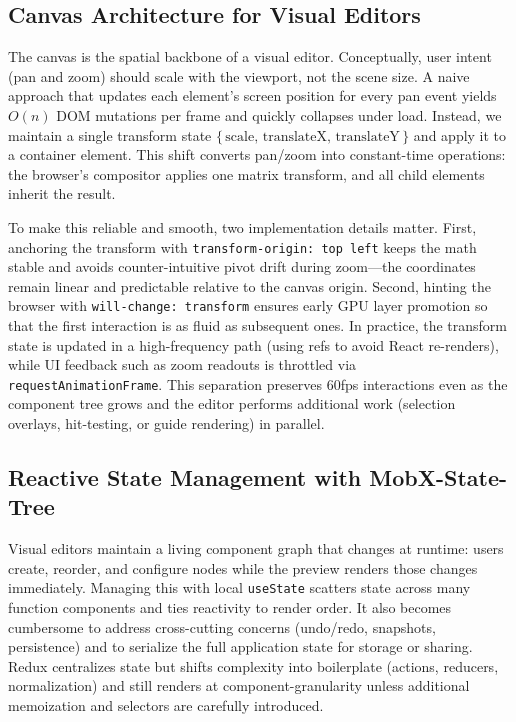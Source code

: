 \documentclass[oneside,12pt]{book}
\begin{document}
\subsection{Canvas Architecture for Visual Editors}
The canvas is the spatial backbone of a visual editor. Conceptually, user intent (pan and zoom) should scale with the viewport, not the scene size. A naive approach that updates each element's screen position for every pan event yields \(O(n)\) DOM mutations per frame and quickly collapses under load. Instead, we maintain a single transform state \(\{\,\text{scale},\, \text{translateX},\, \text{translateY}\,\}\) and apply it to a container element. This shift converts pan/zoom into constant-time operations: the browser's compositor applies one matrix transform, and all child elements inherit the result.

To make this reliable and smooth, two implementation details matter. First, anchoring the transform with \texttt{transform-origin: top left} keeps the math stable and avoids counter-intuitive pivot drift during zoom---the coordinates remain linear and predictable relative to the canvas origin. Second, hinting the browser with \texttt{will-change: transform} ensures early GPU layer promotion so that the first interaction is as fluid as subsequent ones. In practice, the transform state is updated in a high-frequency path (using refs to avoid React re-renders), while UI feedback such as zoom readouts is throttled via \texttt{requestAnimationFrame}. This separation preserves 60fps interactions even as the component tree grows and the editor performs additional work (selection overlays, hit-testing, or guide rendering) in parallel.

\subsection{Reactive State Management with MobX-State-Tree}

Visual editors maintain a living component graph that changes at runtime: users create, reorder, and configure nodes while the preview renders those changes immediately. Managing this with local \texttt{useState} scatters state across many function components and ties reactivity to render order. It also becomes cumbersome to address cross-cutting concerns (undo/redo, snapshots, persistence) and to serialize the full application state for storage or sharing. Redux centralizes state but shifts complexity into boilerplate (actions, reducers, normalization) and still renders at component-granularity unless additional memoization and selectors are carefully introduced.
\end{document}
